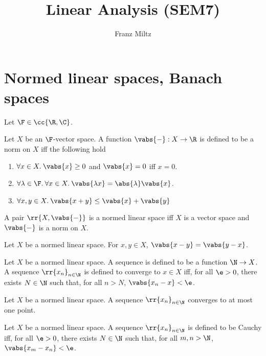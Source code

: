\documentclass{article}
\begin{document}
\mkthmstwounified
\title{Linear Analysis (SEM7)}
\author{Franz Miltz}
\maketitle
\tableofcontents
\pagebreak

\section{Normed linear spaces, Banach spaces}
\label{sec:definitions}

Let $\F\in \cc{ \R,\C }$.

\begin{definition}
	\label{def:nls}
	Let $X$ be an $\F$-vector space.
	A function $ \vabs{ - } : X \to \R$ is defined to be a norm on $X$ iff the following hold
	\begin{enumerate}
		\item $\forall x\in X.\: \vabs{ x }\geq 0$ and $ \vabs{ x } = 0$ iff $x = 0$.
		\item $\forall \lambda\in\F.\:\forall x \in X.\: \vabs{ \lambda x } = \abs{ \lambda } \vabs{ x }$.
		\item $\forall x,y\in X.\: \vabs{ x + y } \leq \vabs{ x } + \vabs{ y }$
	\end{enumerate}
	A pair $ \rr{ X, \vabs{ - } }$ is a normed linear space iff $X$ is a vector space and $ \vabs{ - } $
	is a norm on $X$.
\end{definition}


\begin{theorem}
	\label{thm:symmetry}
	Let $X$ be a normed linear space. For $x,y\in X$, $ \vabs{ x - y } = \vabs{ y - x } $.
\end{theorem}


\begin{definition}
	\label{def:convergence}
	Let $X$ be a normed linear space. A sequence is defined to be a function $\N\to X$. A
	sequence $ \rr{x_n}_{n\in\N}$ is defined to converge to $x\in X$ iff, for all $\e > 0$,
	there exists $N\in\N$ such that, for all $n>N$, $ \vabs{ x_n - x } < \e$.
\end{definition}


\begin{theorem}
	\label{thm:uniquenes-of-the-limit}
	Let $X$ be a normed linear space. A sequence $ \rr{x_n}_{n\in\N}$ converges to at most one point.
\end{theorem}


\begin{definition}
	\label{def:cauchy}
	Let $X$ be a normed linear space. A sequence $ \rr{x_n}_{n\in\N}$ is defined to be Cauchy iff,
	for all $\e>0$, there exists $N\in\N$ such that, for all $m,n>\N$, $ \vabs{ x_m - x_n } < \e$.
\end{definition}
\end{document}
